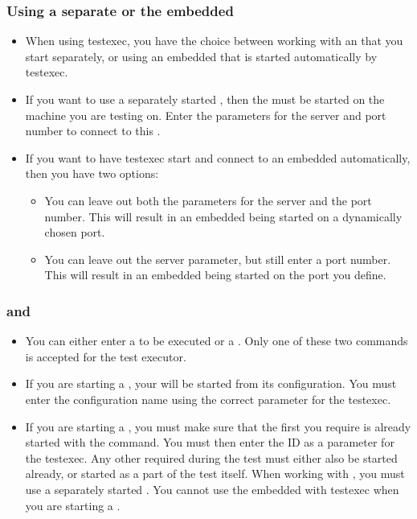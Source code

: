 \subsubsection{Using a separate \gdagent{} or the embedded \gdagent{}}
\label{TasksTestExecAgent}
\begin{itemize}
\item When using testexec, you have the choice between working with an \gdagent{} that you start separately, or using an embedded \gdagent{} that is started automatically by testexec.
\item If you want to use a separately started \gdagent{}, then the \gdagent{} must be started on the machine you are testing on. Enter the parameters for the server and port number to connect to this \gdagent{}.
\item If you want to have testexec start and connect to an embedded \gdagent{} automatically, then you have two options:
\begin{itemize}
\item You can leave out both the parameters for the server and the port number. This will result in an embedded \gdagent{} being started on a dynamically chosen port.
\item You can leave out the server parameter, but still enter a port number. This will result in an embedded \gdagent{} being started on the port you define.
\end{itemize}
\end{itemize}


\subsubsection{\gdsuites{} and \gdjobs{}}
\label{TasksTestExecSuiteOrJob}
\begin{itemize}
\item You can either enter a \gdsuite{} to be executed or a \gdjob{}. Only one of these two commands is accepted for the test executor. 
\item If you are starting a \gdsuite{}, your \gdaut{} will be started from its configuration. You must enter the configuration name using the correct parameter for the testexec.
\item  If you are starting a \gdjob{}, you must make sure that the first \gdaut{} you require is already started with the  command. You must then enter the \gdaut{} ID as a parameter for the testexec. Any other \gdauts{} required during the test must either also be started already, or started as a part of the test itself. When working with \gdjobs{}, you must use a separately started \gdagent{}. You cannot use the embedded \gdagent{} with testexec when you are starting a \gdjob{}.
\end{itemize}

